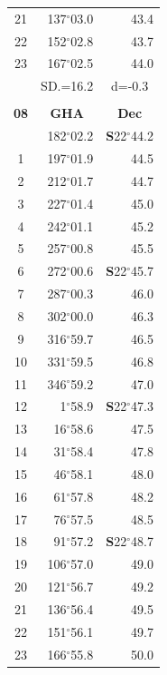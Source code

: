 \documentclass[10pt, a4paper]{report}
\begin{document}
\begin{scriptsize}
\begin{tabular*}{0.2\textwidth}[t]{@{\extracolsep{\fill}}|c|rr|}
21 & 137$^\circ$03.0 & \raisebox{0.24ex}{\boldmath$\cdot$~\boldmath$\cdot$~~}43.4\\
22 & 152$^\circ$02.8 & 43.7\\
23 & 167$^\circ$02.5 & 44.0\\
\hline
\rule{0pt}{2.4ex} & \multicolumn{1}{c}{SD.=16.2} & \multicolumn{1}{c|}{d=-0.3}\\
\hline
\multicolumn{1}{c}{}\\[-0.5ex]\hline
\multicolumn{1}{|c|}{\rule{0pt}{2.6ex}\textbf{08}} & \multicolumn{1}{c}{\textbf{GHA}} & \multicolumn{1}{c|}{\textbf{Dec}}\\
\hline\rule{0pt}{2.6ex}\noindent
0 & 182$^\circ$02.2 & \textbf{S}22$^\circ$44.2\\
1 & 197$^\circ$01.9 & 44.5\\
2 & 212$^\circ$01.7 & 44.7\\
3 & 227$^\circ$01.4 & \raisebox{0.24ex}{\boldmath$\cdot$~\boldmath$\cdot$~~}45.0\\
4 & 242$^\circ$01.1 & 45.2\\
5 & 257$^\circ$00.8 & 45.5\\[2Pt]
6 & 272$^\circ$00.6 & \textbf{S}22$^\circ$45.7\\
7 & 287$^\circ$00.3 & 46.0\\
8 & 302$^\circ$00.0 & 46.3\\
9 & 316$^\circ$59.7 & \raisebox{0.24ex}{\boldmath$\cdot$~\boldmath$\cdot$~~}46.5\\
10 & 331$^\circ$59.5 & 46.8\\
11 & 346$^\circ$59.2 & 47.0\\[2Pt]
12 & 1$^\circ$58.9 & \textbf{S}22$^\circ$47.3\\
13 & 16$^\circ$58.6 & 47.5\\
14 & 31$^\circ$58.4 & 47.8\\
15 & 46$^\circ$58.1 & \raisebox{0.24ex}{\boldmath$\cdot$~\boldmath$\cdot$~~}48.0\\
16 & 61$^\circ$57.8 & 48.2\\
17 & 76$^\circ$57.5 & 48.5\\[2Pt]
18 & 91$^\circ$57.2 & \textbf{S}22$^\circ$48.7\\
19 & 106$^\circ$57.0 & 49.0\\
20 & 121$^\circ$56.7 & 49.2\\
21 & 136$^\circ$56.4 & \raisebox{0.24ex}{\boldmath$\cdot$~\boldmath$\cdot$~~}49.5\\
22 & 151$^\circ$56.1 & 49.7\\
23 & 166$^\circ$55.8 & 50.0\\

\end{tabular*}
\end{scriptsize}
\end{document}
